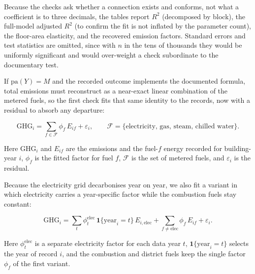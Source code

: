 Because the checks ask whether a connection exists and conforms, not what a coefficient is to three decimals, the tables report $R^2$ (decomposed by block), the full-model adjusted $R^2$ (to confirm the fit is not inflated by the parameter count), the floor-area elasticity, and the recovered emission factors. Standard errors and test statistics are omitted, since with $n$ in the tens of thousands they would be uniformly significant and would over-weight a check subordinate to the documentary test.

If $\mathrm{pa}(Y) = M$ and the recorded outcome implements the documented formula, total emissions must reconstruct as a near-exact linear combination of the metered fuels, so the first check fits that same identity to the records, now with a residual to absorb any departure:

\[
\mathrm{GHG}_i = \sum_{f \in \mathcal{F}} \phi_f\, E_{if} + \varepsilon_i ,
\qquad \mathcal{F} = \{\text{electricity, gas, steam, chilled water}\}.
\]

Here $\mathrm{GHG}_i$ and $E_{if}$ are the emissions and the fuel-$f$ energy recorded for building-year $i$, $\phi_f$ is the fitted factor for fuel $f$, $\mathcal{F}$ is the set of metered fuels, and $\varepsilon_i$ is the residual.

Because the electricity grid decarbonises year on year, we also fit a variant in which electricity carries a year-specific factor while the combustion fuels stay constant:

\[
\mathrm{GHG}_i = \sum_{t} \phi^{\text{elec}}_{t}\, \mathbf{1}\{\text{year}_i = t\}\, E_{i,\text{elec}} + \sum_{f \neq \text{elec}} \phi_f\, E_{if} + \varepsilon_i .
\]

Here $\phi^{\text{elec}}_t$ is a separate electricity factor for each data year $t$, $\mathbf{1}\{\text{year}_i = t\}$ selects the year of record $i$, and the combustion and district fuels keep the single factor $\phi_f$ of the first variant.

